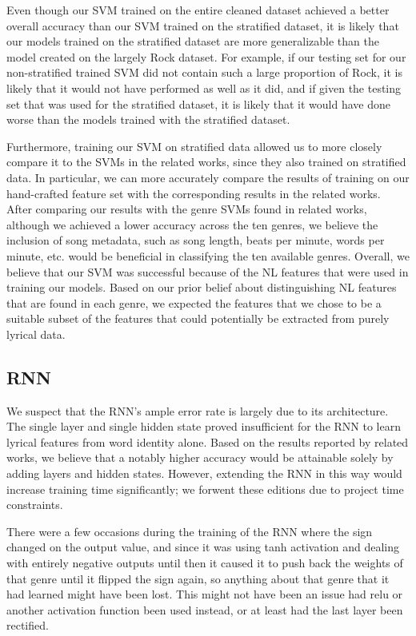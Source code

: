 \documentclass[journal]{IEEEtran}
\begin{document}
Even though our SVM trained on the entire cleaned dataset achieved a better overall accuracy than our SVM trained on the stratified dataset, it is likely that our models trained on the stratified dataset are more generalizable than the model created on the largely Rock dataset. For example, if our testing set for our non-stratified trained SVM did not contain such a large proportion of Rock, it is likely that it would not have performed as well as it did, and if given the testing set that was used for the stratified dataset, it is likely that it would have done worse than the models trained with the stratified dataset.

Furthermore, training our SVM on stratified data allowed us to more closely compare it to the SVMs in the related works, since they also trained on stratified data. In particular, we can more accurately compare the results of training on our hand-crafted feature set with the corresponding results in the related works. After comparing our results with the genre SVMs found in related works, although we achieved a lower accuracy across the ten genres, we believe the inclusion of song metadata, such as song length, beats per minute, words per minute, etc. would be beneficial in classifying the ten available genres. Overall, we believe that our SVM was successful because of the NL features that were used in training our models. Based on our prior belief about distinguishing NL features that are found in each genre, we expected the features that we chose to be a suitable subset of the features that could potentially be extracted from purely lyrical data.

\subsection{RNN}

We suspect that the RNN's ample error rate is largely due to its architecture. The single layer and single hidden state proved insufficient for the RNN to learn lyrical features from word identity alone. Based on the results reported by related works, we believe that a notably higher accuracy would be attainable solely by adding layers and hidden states. However, extending the RNN in this way would increase training time significantly; we forwent these editions due to project time constraints.

There were a few occasions during the training of the RNN where the sign changed on the output value, and since it was using tanh activation and dealing with entirely negative outputs until then it caused it to push back the weights of that genre until it flipped the sign again, so anything about that genre that it had learned might have been lost. This might not have been an issue had relu or another activation function been used instead, or at least had the last layer been rectified. 
\end{document}
